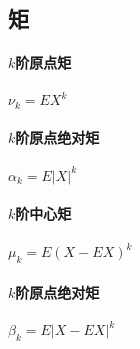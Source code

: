 \subsection{矩}

\paragraph{$k$阶原点矩}
$\nu_{k}=EX^{k}$

\paragraph{$k$阶原点绝对矩}
$\alpha_{k}=E|X|^{k}$

\paragraph{$k$阶中心矩}
$\mu_{k}=E(X-EX)^{k}$

\paragraph{$k$阶原点绝对矩}
$\beta_{k}=E|X-EX|^{k}$

